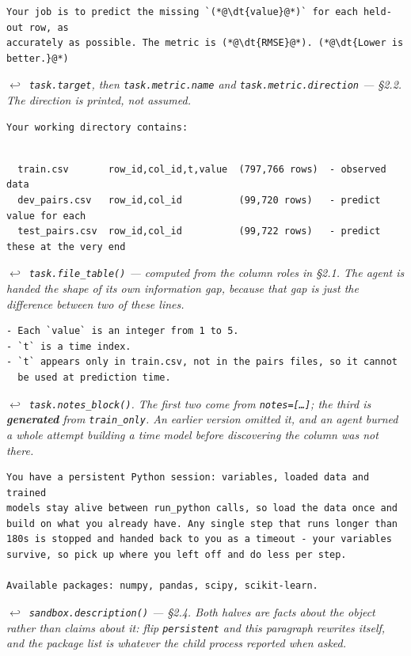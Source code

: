 \documentclass[11pt]{article}
\newcommand{\dt}[1]{\textcolor{taskink}{\bfseries #1}}
\newcommand{\from}[1]{\vspace{-2pt}\par\noindent\hspace*{12pt}%
  \begin{minipage}{\dimexpr\linewidth-14pt\relax}
  {\small\color{midgrey}$\hookleftarrow$~\itshape #1}
  \end{minipage}\par\smallskip}
\begin{document}
\begin{lstlisting}[style=prompt]
Your job is to predict the missing `(*@\dt{value}@*)` for each held-out row, as
accurately as possible. The metric is (*@\dt{RMSE}@*). (*@\dt{Lower is better.}@*)
\end{lstlisting}
\from{\texttt{task.target}, then \texttt{task.metric.name} and \texttt{task.metric.direction} ---
\S2.2. The direction is printed, not assumed.}

\begin{lstlisting}[style=prompt]
Your working directory contains:
\end{lstlisting}
\begin{lstlisting}[style=promptwide]

  train.csv       row_id,col_id,t,value  (797,766 rows)  - observed data
  dev_pairs.csv   row_id,col_id          (99,720 rows)   - predict value for each
  test_pairs.csv  row_id,col_id          (99,722 rows)   - predict these at the very end
\end{lstlisting}
\from{\texttt{task.file\_table()} --- computed from the column roles in \S2.1. The agent is
handed the shape of its own information gap, because that gap is just the difference between two
of these lines.}

\begin{lstlisting}[style=ptask]
- Each `value` is an integer from 1 to 5.
- `t` is a time index.
- `t` appears only in train.csv, not in the pairs files, so it cannot
  be used at prediction time.
\end{lstlisting}
\from{\texttt{task.notes\_block()}. The first two come from \texttt{notes=[\ldots]}; the third is
\textbf{generated} from \texttt{train\_only}. An earlier version omitted it, and an agent burned a
whole attempt building a time model before discovering the column was not there.}

\begin{lstlisting}[style=psand]
You have a persistent Python session: variables, loaded data and trained
models stay alive between run_python calls, so load the data once and
build on what you already have. Any single step that runs longer than
180s is stopped and handed back to you as a timeout - your variables
survive, so pick up where you left off and do less per step.

Available packages: numpy, pandas, scipy, scikit-learn.
\end{lstlisting}
\from{\texttt{sandbox.description()} --- \S2.4. Both halves are facts about the object rather than
claims about it: flip \texttt{persistent} and this paragraph rewrites itself, and the package list
is whatever the child process reported when asked.}
\end{document}
